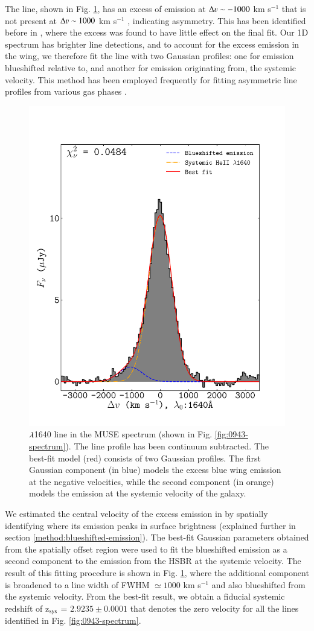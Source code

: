 The  line, shown in Fig. \ref{fig:HeII-line}, has an excess of emission at $\Delta \varv \sim-1000$ km s$^{-1}$ that is not present at $\Delta \varv \sim1000$ km s$^{-1}$ , indicating asymmetry. This has been identified before in \citet{jarvis2003}, where the excess was found to have little effect on the final fit. Our 1D spectrum has brighter line detections, and to account for the excess emission in the wing, we therefore fit the  line with two Gaussian profiles: one for emission blueshifted relative to, and another for emission originating from, the systemic velocity. This method has been employed frequently for fitting asymmetric line profiles from various gas phases \citep[e.g.][]{mullaney2013,cicone2014,rakshit2018,hernandez-garcia2018,perna2019}. 

\begin{figure} 
\centering
\includegraphics[width=0.6\columnwidth]{plots_chp3/HeII_fit.pdf}
\caption[ $\lam$1640 line in MUSE and its best-fit]{ $\lam$1640 line in the MUSE spectrum (shown in Fig. \ref{fig:0943-spectrum}). The line profile has been continuum subtracted. The best-fit model (red) consists of two Gaussian profiles. The first Gaussian component (in blue) models the excess blue wing emission at the negative velocities, while the second component (in orange) models the emission at the systemic velocity of the galaxy. }
\label{fig:HeII-line}
\end{figure}

We estimated the central velocity of the excess emission in  by spatially identifying where its emission peaks in surface brightness (explained further in section \ref{method:blueshifted-emission}). The best-fit Gaussian parameters obtained from the spatially offset region were used to fit the blueshifted emission as a second component to the emission from the HSBR at the systemic velocity. The result of this fitting procedure is shown in Fig. \ref{fig:HeII-line}, where the additional component is broadened to a line width of FWHM $\simeq1000$ km s$^{-1}$ and also blueshifted from the systemic velocity. From the  best-fit result, we obtain a fiducial systemic redshift of z$_{\rm sys}$ = $2.9235 \pm 0.0001$ that denotes the zero velocity for all the lines identified in Fig. \ref{fig:0943-spectrum}.

